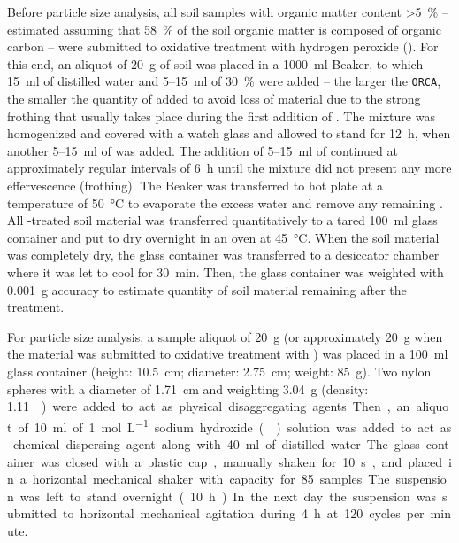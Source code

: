 Before particle size analysis, all soil samples with organic matter content \SI{>5}{\percent} -- estimated 
assuming that \SI{58}{\percent} of the soil organic matter is composed of organic carbon -- were submitted to 
oxidative treatment with hydrogen peroxide (). For this end, an aliquot of \SI{20}{\g} of soil was 
placed in a \SI{1000}{\ml} Beaker, to which \SI{15}{\ml} of distilled water and 5--\SI{15}{\ml} of 
\SI{30}{\percent}  were added -- the larger the \texttt{ORCA}, the smaller the quantity of  
added to avoid loss of material due to the strong frothing that usually takes place during the first addition 
of . The mixture was homogenized and covered with a watch glass and allowed to stand for 
\SI{12}{\hour}, when another 5--\SI{15}{\ml} of  was added. The addition of 5--\SI{15}{\ml} of 
 continued at approximately regular intervals of \SI{6}{\hour} until the mixture did not present any 
more effervescence (frothing). The Beaker was transferred to hot plate at a temperature of \SI{50}{\celsius} 
to evaporate the excess water and remove any remaining . All -treated soil material was 
transferred quantitatively to a tared \SI{100}{\ml} glass container and put to dry overnight in an oven at 
\SI{45}{\celsius}. When the soil material was completely dry, the glass container was transferred to a 
desiccator chamber where it was let to cool for \SI{30}{\minute}. Then, the glass container was weighted with 
\SI{0.001}{\g} accuracy to estimate quantity of soil material remaining after the  treatment.

For particle size analysis, a sample aliquot of \SI{20}{\g} (or approximately \SI{20}{\g} when the material 
was submitted to oxidative treatment with ) was placed in a \SI{100}{\ml} glass container (height: 
\SI{10.5}{\cm}; diameter: \SI{2.75}{\cm}; weight: \SI{85}{\g}). Two nylon spheres with a diameter of 
\SI{1.71}{\cm} and weighting \SI{3.04}{\g} (density: \SI{1.11}{\g\per\cm\cubic}) were added to act as physical 
disaggregating agents. Then, an aliquot of \SI{10}{\ml} of \SI{1}{\mole\per\liter} sodium hydroxide 
() solution was added to act as chemical dispersing agent along with \SI{40}{\ml} of distilled water. 
The glass container was closed with a plastic cap, manually shaken for \SI{10}{\second}, and placed in a 
horizontal mechanical shaker with capacity for \num{85}~samples. The suspension was left to stand overnight 
(\SI{10}{\hour}). In the next day the suspension was submitted to horizontal mechanical agitation during 
\SI{4}{\hour} at \si{120} cycles per minute.

